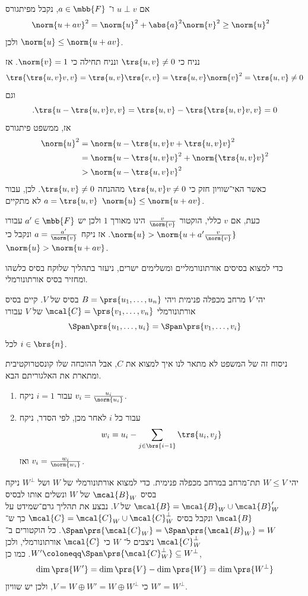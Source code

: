 \documentclass[a4paper,10pt,twoside,openany]{book}
\begin{document}
\begin{solution}
אם
$u \perp v$
ו־%
$a \in \mbb{F}$,
נקבל מפיתגורס
\begin{align*}
\norm{u+av}^2 &= \norm{u}^2 + \abs{a}^2 \norm{v}^2 \geq \norm{u}^2
\end{align*}
ולכן
$\norm{u} \leq \norm{u+av}$.

נניח כי
$\trs{u,v} \neq 0$
ונניח תחילה כי
$\norm{v} = 1$.
אז
\[\trs{\trs{u,v}v, v} = \trs{u,v} \trs{v,v} = \trs{u,v} \norm{v}^2 = \trs{u,v} \neq 0\]
וגם
\[\text{.} \trs{u - \trs{u,v}v, v} = \trs{u,v} - \trs{\trs{u,v}v,v} = 0\]
אז, ממשפט פיתגורס
\begin{align*}
\norm{u}^2 &= \norm{u - \trs{u,v}v + \trs{u,v}v}^2
\\&=
\norm{u - \trs{u,v}v}^2 + \norm{\trs{u,v}v}^2
\\&>
\norm{u-\trs{u,v}v}^2
\end{align*}
כאשר האי־שוויון חזק כי
$\trs{u,v}v \neq 0$
מההנחה
$\trs{u,v} \neq 0$.
לכן, עבור
$a = \trs{u,v}$
לא מתקיים
$\norm{u} \leq \norm{u+av}$.

כעת, אם
$v$
כללי, הוקטור
$\frac{v}{\norm{v}}$
הינו מאורך
$1$
ולכן יש
$a' \in \mbb{F}$
עבורו
$\norm{u} > \norm{u+a' \frac{v}{\norm{v}}}$.
אז ניקח
$a = \frac{a'}{\norm{v}}$
ונקבל כי
$\norm{u} > \norm{u + av}$.
\end{solution}

כדי למצוא בסיסים אורתונורמליים ומשלימים ישרים, ניעזר בתהליך שלוקח בסיס כלשהו ומחזיר בסיס אורתונורמלי.

\begin{theorem}
יהי
$V$
מרחב מכפלה פנימית ויהי
$B = \prs{u_1, \ldots, u_n}$
בסיס של
$V$.
קיים בסיס אורתונורמלי
$\mcal{C} = \prs{v_1, \ldots, v_n}$
של
$V$
עבורו
\[\Span\prs{u_1, \ldots, u_i} = \Span\prs{v_1, \ldots, v_i}\]
לכל
$i \in \brs{n}$.
\end{theorem}

ניסוח זה של המשפט לא מתאר לנו איך למצוא את
$C$,
אבל ההוכחה שלו קונסטרוקטיבית ומתארת את האלגוריתם הבא.

\begin{enumerate}
\item
עבור
$i = 1$
ניקח
$v_i = \frac{u_i}{\norm{u_i}}$.

\item
עבור כל
$i$
לאחר מכן, לפי הסדר, ניקח
\[w_i = u_i - \sum_{j \in \brs{i-1}} \trs{u_i, v_j}\]
ואז
$v_i = \frac{w_i}{\norm{w_i}}$.
\end{enumerate}

\begin{corollary}
יהי
$W \leq V$
תת־מרחב במרחב מכפלה פנימית.
כדי למצוא אורתונורמלי של
$W$
ושל
$W^\perp$
ניקח בסיס
$\mcal{B}_W$
של
$W$
ונשלים אותו לבסיס
$\mcal{B} = \mcal{B}_W \cup \mcal{B}'_W$
של
$V$.
נבצע את תהליך גרם־שמידט על
$\mcal{B}$
ונקבל בסיס
$\mcal{C} = \mcal{C}_W \cup \mcal{C}_W^\perp$
כך ש־%
$\Span\prs{\mcal{C}_W} = \Span\prs{\mcal{B}_W} = W$.
כל הוקטורים ב־%
$\mcal{C}_W^\perp$
ניצבים ל־%
$W$
כי
$\mcal{C}$
אורתונורמלי, ולכן
$W' \coloneqq \Span\prs{\mcal{C}_W^\perp} \subseteq W^\perp$.
כמו כן,
\[\dim\prs{W'} = \dim\prs{V} - \dim\prs{W} = \dim\prs{W^\perp}\]
כי
$V = W \oplus W' = W \oplus W^\perp$,
ולכן יש שוויון
$W' = W^\perp$.
\end{corollary}
\end{document}
